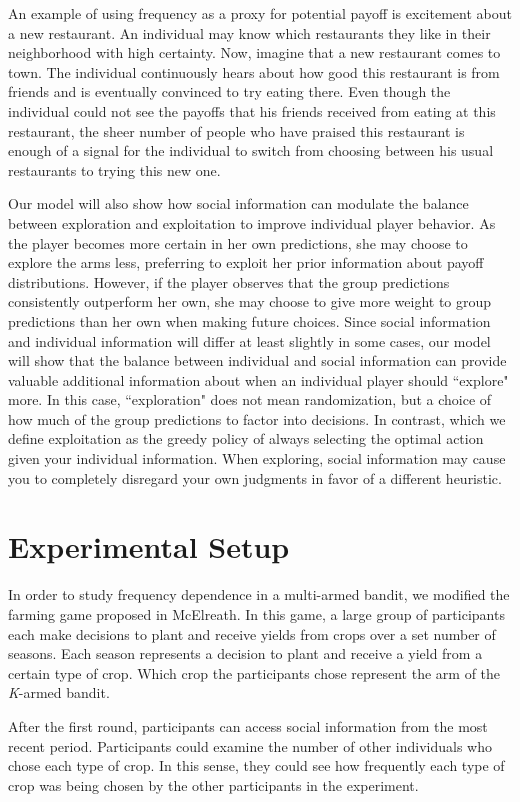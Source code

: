 \documentclass[11pt, a4paper]{article}
\begin{document}
An example of using frequency as a proxy for potential payoff is excitement about a new restaurant. An individual may know which restaurants they like in their neighborhood with high certainty. Now, imagine that a new restaurant comes to town. The individual continuously hears about how good this restaurant is from friends and is eventually convinced to try eating there. Even though the individual could not see the payoffs that his friends received from eating at this restaurant, the sheer number of people who have praised this restaurant is enough of a signal for the individual to switch from choosing between his usual restaurants to trying this new one. 

Our model will also show how social information can modulate the balance between exploration and exploitation to improve individual player behavior. As the player becomes more certain in her own predictions, she may choose to explore the arms less, preferring to exploit her prior information about payoff distributions. However, if the player observes that the group predictions consistently outperform her own, she may choose to give more weight to group predictions than her own when making future choices. Since social information and individual information will differ at least slightly in some cases, our model will show that the balance between individual and social information can provide valuable additional information about when an individual player should ``explore" more. In this case, ``exploration" does not mean randomization, but a choice of how much of the group predictions to factor into decisions. In contrast, which we define exploitation as the greedy policy of always selecting the optimal action given your individual information. When exploring, social information may cause you to completely disregard your own judgments in favor of a different heuristic. 

\section{Experimental Setup}
In order to study frequency dependence in a multi-armed bandit, we modified the farming game proposed in McElreath. In this game, a large group of participants each make decisions to plant and receive yields from crops over a set number of seasons. Each season represents a decision to plant and receive a yield from a certain type of crop. Which crop the participants chose represent the arm of the \textit{K}-armed bandit. 

After the first round, participants can access social information from the most recent period. Participants could examine the number of other individuals who chose each type of crop. In this sense, they could see how frequently each type of crop was being chosen by the other participants in the experiment.
\end{document}

